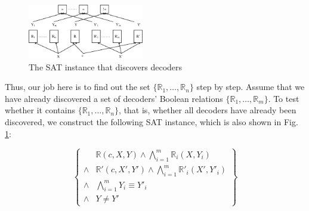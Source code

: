 \documentclass[journal]{IEEEtran}
\begin{document}
%

\begin{figure}[t]
\centering
\includegraphics[width=0.45\textwidth]{fdtest}
\caption{The SAT instance that discovers decoders}
\label{fig_fdtest}
\end{figure}

Thus,
our job here is to find out the set $\{\mathbb{R}_1,\dots,\mathbb{R}_n\}$ step by step.
Assume that we have already discovered a set of decoders' Boolean relations $\{\mathbb{R}_1,\dots,\mathbb{R}_{m}\}$.
To test whether it contains $\{\mathbb{R}_1,\dots,\mathbb{R}_n\}$,
that is,
whether all decoders have already been discovered,
we construct the following SAT instance,
which is also shown in Fig. \ref{fig_fdtest}:



\begin{equation}\label{equ_fdtest}
\left\{
\begin{array}{cc}
      & \mathbb{R}(c,X,Y)\wedge \bigwedge_{i=1}^{m}\mathbb{R}_i(X,Y_i)  \\
\wedge& \mathbb{R}'(c,X',Y') \wedge \bigwedge_{i=1}^{m}\mathbb{R}'_i(X',Y'_i)  \\
\wedge&\bigwedge_{i=1}^{m}Y_i\equiv Y'_i\\
\wedge& Y\ne Y'
\end{array}
\right\}
\end{equation}
\end{document}
